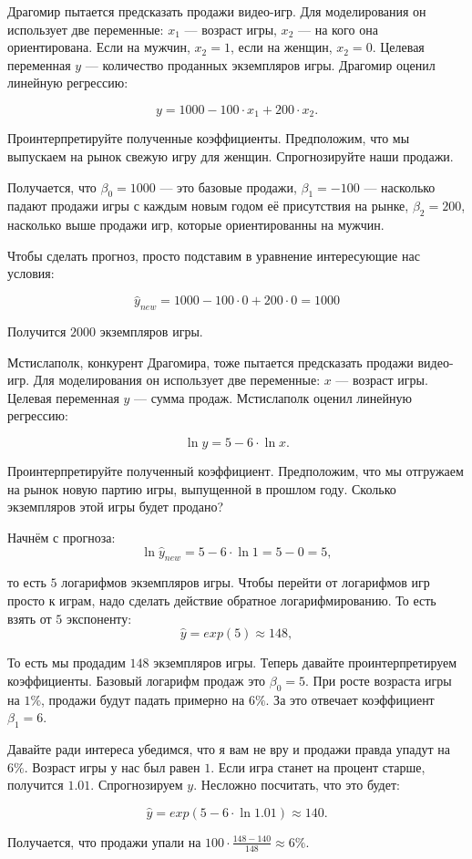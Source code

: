 \documentclass[12pt, a4paper, oneside]{article}
\theoremstyle{plain} %
\theoremstyle{definition}
\begin{document}
\begin{problem}{ }
Драгомир пытается предсказать продажи видео-игр.  Для моделирования он использует две переменные: $x_1$ --- возраст игры, $x_2$ --- на кого она ориентирована. Если на мужчин, $x_2=1$, если на женщин, $x_2=0$. Целевая переменная $y$ --- количество проданных экземпляров игры. Драгомир оценил линейную регрессию: 

$$ y = 1000 - 100 \cdot  x_1 + 200 \cdot  x_2.$$

Проинтерпретируйте полученные коэффициенты.  Предположим, что мы выпускаем на рынок свежую игру для женщин. Спрогнозируйте наши продажи. 
\end{problem}

\begin{solution}
Получается, что $\beta_0 = 1000$ --- это базовые продажи, $\beta_1 = -100$ --- насколько падают продажи игры с каждым новым годом её присутствия на рынке, $\beta_2 = 200$, насколько выше продажи игр, которые ориентированны на мужчин.

Чтобы сделать прогноз, просто подставим в уравнение интересующие нас условия: 

$$ 
\hat y_{new} = 1000 - 100 \cdot 0 + 200 \cdot 0 = 1000
$$

Получится $2000$ экземпляров игры. 
\end{solution}


\begin{problem}{ }
Мстислаполк, конкурент Драгомира, тоже пытается предсказать продажи видео-игр.  Для моделирования он использует две переменные: $x$ --- возраст игры. Целевая переменная $y$ --- сумма продаж. Мстислаполк оценил линейную регрессию: 

$$ 
\ln y = 5 - 6 \cdot  \ln x.
$$

Проинтерпретируйте полученный коэффициент.  Предположим, что мы отгружаем на рынок новую партию игры, выпущенной в прошлом году. Сколько экземпляров этой игры будет продано? 
\end{problem}

\begin{solution}
Начнём с прогноза: 
$$ 
\ln \hat y_{new} = 5 - 6 \cdot \ln 1 = 5 - 0 = 5,
$$

то есть $5$ логарифмов экземпляров игры. Чтобы перейти от логарифмов игр просто к играм, надо сделать действие обратное логарифмированию. То есть взять от $5$ экспоненту: 
$$
\hat y = exp(5) \approx 148,
$$

То есть мы продадим $148$ экземпляров игры. Теперь давайте проинтерпретируем коэффициенты. Базовый логарифм продаж это $\beta_0 = 5$.  При росте возраста игры на $1\%$, продажи будут падать примерно на $6\%$. За это отвечает коэффициент $\beta_1 = 6$. 

Давайте ради интереса убедимся, что я вам не вру и продажи правда упадут на $6\%.$  Возраст игры у нас был равен $1$. Если игра станет на процент старше, получится $1.01$. Спрогнозируем $y$. Несложно посчитать, что это будет:

$$
\hat y = exp(5 - 6 \cdot \ln 1.01) \approx 140.
$$

Получается, что продажи упали на $100 \cdot \frac{148-140}{148} \approx 6\%$.
\end{solution}
\end{document}
